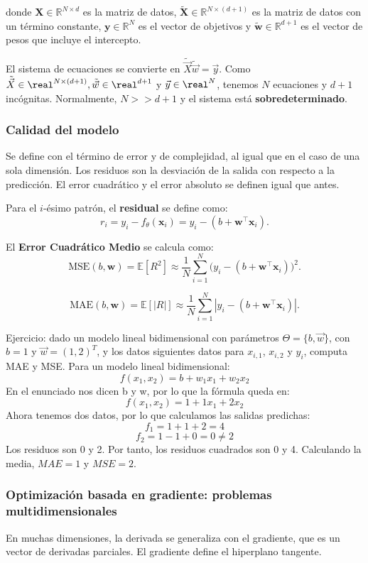 donde $\mathbf{X} \in \mathbb{R}^{N \times d}$ es la matriz de datos, $ \tilde{\mathbf{X}} \in \mathbb{R}^{N \times (d+1)}$ es la matriz de datos con un término constante, $\mathbf{y} \in \mathbb{R}^N$ es el vector de objetivos y $\tilde{\mathbf{w}} \in \mathbb{R}^{d+1}$ es el vector de pesos que incluye el intercepto.

El sistema de ecuaciones se convierte en $\tilde{\vec{X}}\tilde{\vec{w}} = \vec{y}$. Como $\tilde{\vec{X}} \in \real^{N \times (d + 1)}, \tilde{\vec{w}} \in \real^{d + 1}$ y $\vec{y} \in \real^N$, tenemos $N$ ecuaciones y $d + 1$ incógnitas. Normalmente, $N >> d+1$ y el sistema está \textbf{sobredeterminado}.

\subsubsection{Calidad del modelo}
Se define con el término de error y de complejidad, al igual que en el caso de una sola dimensión. Los residuos son la desviación de la salida con respecto a la predicción. El error cuadrático y el error absoluto se definen igual que antes.

Para el $i$-ésimo patrón, el \textbf{residual} se define como:
$$
r_i = y_i - f_\theta(\mathbf{x}_i) = y_i - (b + \mathbf{w}^\intercal\mathbf{x}_i).
$$

El \textbf{Error Cuadrático Medio} se calcula como:
$$
\text{MSE}(b, \mathbf{w}) = \mathbb{E}\left[R^2\right] \approx \frac{1}{N} \sum_{i=1}^{N} \big(y_i - (b + \mathbf{w}^\intercal\mathbf{x}_i)\big)^2.
$$

$$
\text{MAE}(b, \mathbf{w}) = \mathbb{E}\left[|R|\right] \approx \frac{1}{N} \sum_{i=1}^{N} \left|y_i - (b + \mathbf{w}^\intercal\mathbf{x}_i)\right|.
$$

Ejercicio: dado un modelo lineal bidimensional con parámetros $\Theta = \{b, \vec{w}\}$, con $b=1$ y $\vec{w} = (1,2)^T$, y los datos siguientes datos para $x_{i,1}$, $x_{i,2}$ y $y_i$, computa MAE y MSE.
Para un modelo lineal bidimensional:
$$f(x_1, x_2) = b + w_1x_1 + w_2x_2$$
En el enunciado nos dicen b y w, por lo que la fórmula queda en:
$$f(x_1, x_2) = 1 + 1 x_1 + 2 x_2$$
Ahora tenemos dos datos, por lo que calculamos las salidas predichas:
$$f_1 = 1 + 1 + 2 = 4$$
$$f_2 = 1 - 1 + 0 = 0 \neq 2$$
Los residuos son 0 y 2. Por tanto, los residuos cuadrados son 0 y 4. Calculando la media, $MAE = 1$ y $MSE = 2$. 

\subsubsection{Optimización basada en gradiente: problemas multidimensionales}
En muchas dimensiones, la derivada se generaliza con el gradiente, que es un vector de derivadas parciales. El gradiente define el hiperplano tangente. 

